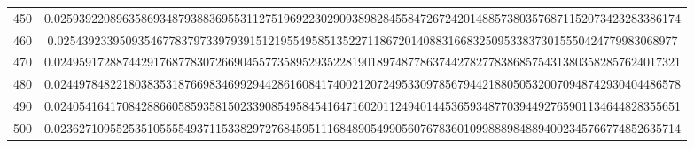 \documentclass[final]{article}
\begin{document}
\begin{table}
\begin{center}
\begin{tabular}{|c|c|}
450 &   0.02593922089635869348793883695531127519692230290938982845584726724201488573803576871152073423283386174 \\
460 &   0.0254392339509354677837973397939151219554958513522711867201408831668325095338373015550424779983068977  \\
470 &   0.02495917288744291768778307266904557735895293522819018974877863744278277838685754313803582857624017321 \\
480 &   0.02449784822180383531876698346992944286160841740021207249533097856794421880505320070948742930404486578 \\
490 &   0.02405416417084288660585935815023390854958454164716020112494014453659348770394492765901134644828355651 \\
500 &   0.02362710955253510555549371153382972768459511168489054990560767836010998889848894002345766774852635714 \\
\hline
\hline
\end{tabular}
\end{center}
\bigskip\bigskip
\end{table}
\end{document}
